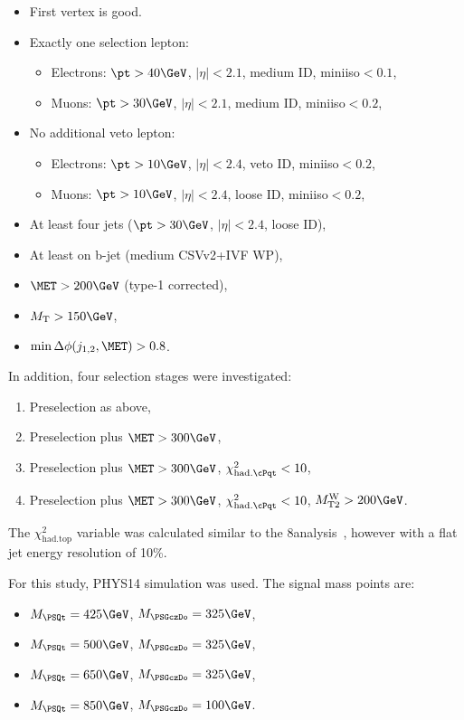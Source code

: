 \begin{itemize}
\item First vertex is good.
\item Exactly one selection lepton:
	\begin{itemize}
	\item Electrons: $\pt>40\GeV$, $|\eta|<2.1$, medium ID, miniiso$ < 0.1$,
	\item Muons: $\pt>30\GeV$, $|\eta|<2.1$, medium ID, miniiso$ < 0.2$,
	\end{itemize}
\item No additional veto lepton:
	\begin{itemize}
	\item Electrons: $\pt>10\GeV$, $|\eta|<2.4$, veto ID, miniiso$ < 0.2$,
	\item Muons: $\pt>10\GeV$, $|\eta|<2.4$, loose ID, miniiso$ < 0.2$,
	\end{itemize}
\item  At least four jets ($\pt>30\GeV$, $|\eta|<2.4$, loose ID),
\item  At least on b-jet (medium CSVv2+IVF WP),
\item  $\MET>200\GeV$ (type-1 corrected),
\item  $\MT>150\GeV$,
\item  $\minDPhiMETjet>0.8$.
\end{itemize}
In addition, four selection stages were investigated:
\begin{enumerate}
\item Preselection as above,
\item Preselection plus $\MET>300\GeV$,
\item Preselection plus $\MET>300\GeV$, $\chi^2_{\mathrm{had.}\cPqt}<10$,
\item Preselection plus $\MET>300\GeV$, $\chi^2_{\mathrm{had.}\cPqt}<10$, $\MTtW>200\GeV$.
\end{enumerate}
The $\chi^2_\mathrm{had.top}$ variable was calculated similar to the 8\TeV analysis~\cite{Chatrchyan:2013xna}, however with a flat jet energy resolution of 10\%.

For this study, PHYS14 simulation was used. The signal mass points are:
\begin{itemize}
\item $M_{\PSQt} = 425\GeV$, $M_{\PSGczDo} = 325\GeV$,
\item $M_{\PSQt} = 500\GeV$, $M_{\PSGczDo} = 325\GeV$,
\item $M_{\PSQt} = 650\GeV$, $M_{\PSGczDo} = 325\GeV$,
\item $M_{\PSQt} = 850\GeV$, $M_{\PSGczDo} = 100\GeV$.
\end{itemize}

